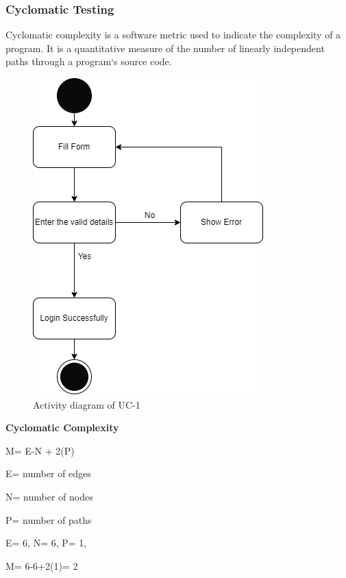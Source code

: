 
\subsubsection{ Cyclomatic Testing}
Cyclomatic complexity is a software metric used to indicate the complexity of a program. It is a
quantitative measure of the number of linearly independent paths through a program`s source code.

\begin{figure}[H]

    \centering
    \includegraphics[scale=0.7]{./diagrams/Activity Diagram/ad-01.png}
    \caption{Activity diagram of UC-1}
    \label{fig:act-01}

\end{figure}

\textbf{Cyclomatic Complexity}

M= E-N + 2(P)

E= number of edges

N= number of nodes

P= number of paths

E= 6,
N= 6,
P= 1,

M= 6-6+2(1)= 2

